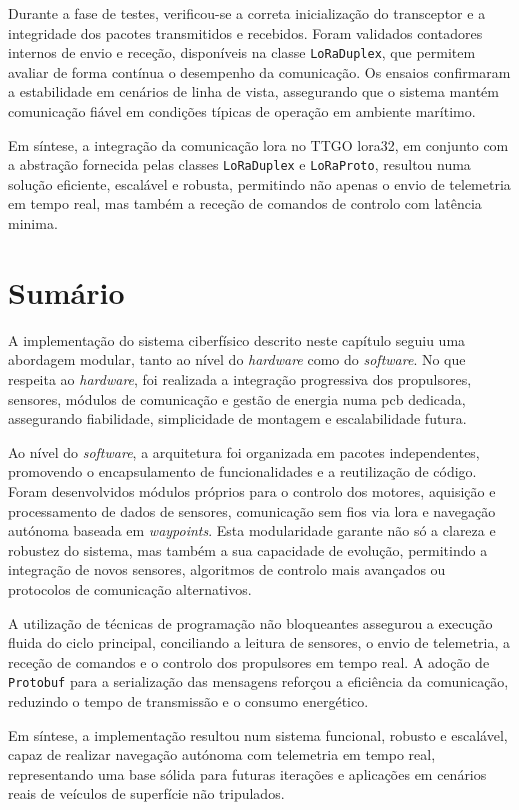 Durante a fase de testes, verificou-se a correta inicialização do transceptor e a integridade dos pacotes transmitidos e recebidos. Foram validados contadores internos de envio e receção, disponíveis na classe \texttt{LoRaDuplex}, que permitem avaliar de forma contínua o desempenho da comunicação. Os ensaios confirmaram a estabilidade em cenários de linha de vista, assegurando que o sistema mantém comunicação fiável em condições típicas de operação em ambiente marítimo.  

Em síntese, a integração da comunicação \gls{lora} no TTGO \gls{lora}32, em conjunto com a abstração fornecida pelas classes \texttt{LoRaDuplex} e \texttt{LoRaProto}, resultou numa solução eficiente, escalável e robusta, permitindo não apenas o envio de telemetria em tempo real, mas também a receção de comandos de controlo com latência minima.

\section{Sumário}
\label{sec:implementacao-sumario}

A implementação do sistema ciberfísico descrito neste capítulo seguiu uma abordagem modular, tanto ao nível do \emph{hardware} como do \emph{software}. No que respeita ao \emph{hardware}, foi realizada a integração progressiva dos propulsores, sensores, módulos de comunicação e gestão de energia numa \gls{pcb} dedicada, assegurando fiabilidade, simplicidade de montagem e escalabilidade futura.  

Ao nível do \emph{software}, a arquitetura foi organizada em pacotes independentes, promovendo o encapsulamento de funcionalidades e a reutilização de código. Foram desenvolvidos módulos próprios para o controlo dos motores, aquisição e processamento de dados de sensores, comunicação sem fios via \gls{lora} e navegação autónoma baseada em \emph{waypoints}. Esta modularidade garante não só a clareza e robustez do sistema, mas também a sua capacidade de evolução, permitindo a integração de novos sensores, algoritmos de controlo mais avançados ou protocolos de comunicação alternativos.  

A utilização de técnicas de programação não bloqueantes assegurou a execução fluida do ciclo principal, conciliando a leitura de sensores, o envio de telemetria, a receção de comandos e o controlo dos propulsores em tempo real. A adoção de \texttt{Protobuf} para a serialização das mensagens reforçou a eficiência da comunicação, reduzindo o tempo de transmissão e o consumo energético.  

Em síntese, a implementação resultou num sistema funcional, robusto e escalável, capaz de realizar navegação autónoma com telemetria em tempo real, representando uma base sólida para futuras iterações e aplicações em cenários reais de veículos de superfície não tripulados.

